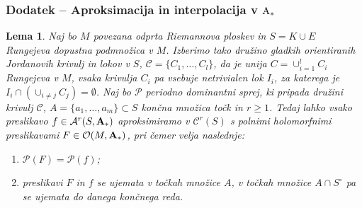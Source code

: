 \documentclass[9pt, table]{beamer}
\newtheorem{lema}{Lema}
\begin{document}
\begin{frame}
\frametitle{Dodatek -- Aproksimacija in interpolacija v $\textup{A}_{*}$}

\begin{lema}
Naj bo $M$ povezana odprta Riemannova ploskev in $S = K \cup E$ Rungejeva dopustna podmnožica v $M$.
Izberimo tako družino gladkih orientiranih Jordanovih krivulj in lokov v $S$, $\mathcal{C} = \{ C_{1}, \dots , C_{l} \}$, da je unija $C = \cup_{i=1}^{l} C_{i}$ Rungejeva v $M$, vsaka krivulja $C_{i}$ pa vsebuje netrivialen lok $I_{i}$, za katerega je $I_{i} \cap (\cup_{i \neq j} C_{j}) = \emptyset$.
Naj bo $\mathcal{P}$ periodno dominantni sprej, ki pripada družini krivulj $\mathcal{C}$, $A = \{ a_{1}, \dots , a_{m} \} \subset S$ končna množica točk in $r \geq 1$.
Tedaj lahko vsako preslikavo $f \in \mathcal{A}^{r}(S, \textbf{\textup{A}}_{*})$ aproksimiramo v $\mathcal{C}^{r}(S)$ s polnimi holomorfnimi preslikavami $F \in \mathcal{O}(M,\textbf{\textup{A}}_{*})$, pri čemer velja naslednje:
\begin{enumerate}
\item $\mathcal{P}(F) = \mathcal{P}(f)$;
\item preslikavi $F$ in $f$ se ujemata v točkah množice $A$, v točkah množice $A \cap S^{\circ}$ pa se ujemata do danega končnega reda.
\end{enumerate}
\end{lema}

\end{frame}

\end{document}
